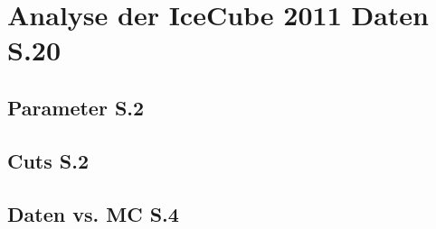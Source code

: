 \thispagestyle{plain}
\chapter{Analyse der IceCube 2011 Daten S.20}

\section{Parameter S.2}
\section{Cuts S.2}
\section{Daten vs. MC S.4}